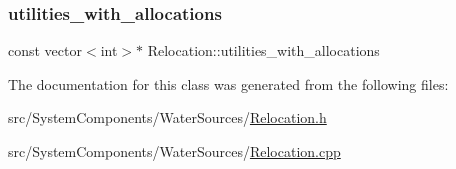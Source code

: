 \subsubsection{\texorpdfstring{utilities\+\_\+with\+\_\+allocations}{utilities\_with\_allocations}}
{\footnotesize\ttfamily const vector$<$int$>$$\ast$ Relocation\+::utilities\+\_\+with\+\_\+allocations}



The documentation for this class was generated from the following files\+:\begin{DoxyCompactItemize}
\item 
src/\+System\+Components/\+Water\+Sources/\mbox{\hyperlink{Relocation_8h}{Relocation.\+h}}\item 
src/\+System\+Components/\+Water\+Sources/\mbox{\hyperlink{Relocation_8cpp}{Relocation.\+cpp}}\end{DoxyCompactItemize}
